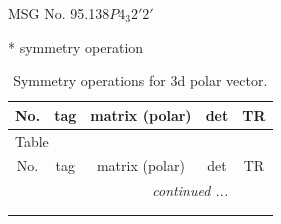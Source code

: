 \documentclass[fleqn,8pt]{jsarticle}
\begin{document}
\setcounter{MaxMatrixCols}{32}

\renewcommand{\tablename}{Table~}
\renewcommand{\figurename}{Figure~}
\begin{center}
\LARGE
MSG No. 95.138\quad$P4_{3}2'2'$
\end{center}
* symmetry operation
\renewcommand{\arraystretch}{1.3}
\begin{longtable}{ccccc}
\caption{Symmetry operations for 3d polar vector.}
 \\
 \hline \hline
No. & tag & matrix (polar) & det & TR \\ \hline \endfirsthead

\multicolumn{4}{l}{\tablename\ \thetable{}} \\
 \hline \hline
No. & tag & matrix (polar) & det & TR \\ \hline \endhead

 \hline \hline
\multicolumn{4}{r}{\footnotesize\it continued ...} \\ \endfoot

 \hline \hline
\multicolumn{4}{r}{} \\ \endlastfoot


\end{longtable}
\end{document}
